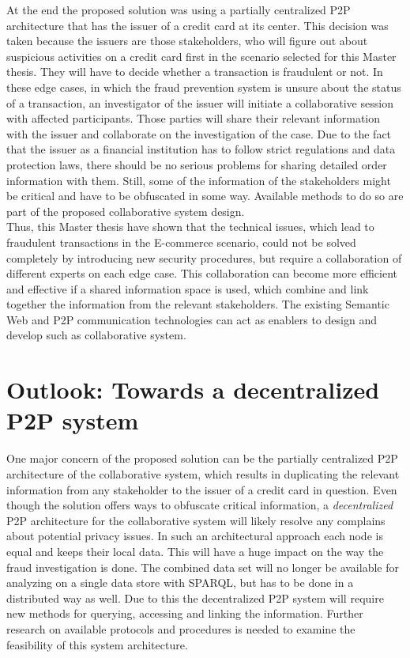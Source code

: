 At the end the proposed solution was using a partially centralized \gls{P2P} architecture that has the issuer of a credit card at its center. This decision was taken because the issuers are those stakeholders, who will figure out about suspicious activities on a credit card first in the scenario selected for this Master thesis. They will have to decide whether a transaction is fraudulent or not. In these edge cases, in which the fraud prevention system is unsure about the status of a transaction, an investigator of the issuer will initiate a collaborative session with affected participants. Those parties will share their relevant information with the issuer and collaborate on the investigation of the case. Due to the fact that the issuer as a financial institution has to follow strict regulations and data protection laws, there should be no serious problems for sharing detailed order information with them. Still, some of the information of the stakeholders might be critical and have to be obfuscated in some way. Available methods to do so are part of the proposed collaborative system design. \\

Thus, this Master thesis have shown that the technical issues, which lead to fraudulent transactions in the \gls{E-commerce} scenario, could not be solved completely by introducing new security procedures, but require a collaboration of different experts on each edge case. This collaboration can become more efficient and effective if a shared information space is used, which combine and link together the information from the relevant stakeholders. The existing Semantic Web and \gls{P2P} communication technologies can act as enablers to design and develop such as collaborative system.

\section{Outlook: Towards a decentralized \gls{P2P} system}
\label{sec:p2p_decentralized_system}

One major concern of the proposed solution can be the partially centralized \gls{P2P} architecture of the collaborative system, which results in duplicating the relevant information from any stakeholder to the issuer of a credit card in question. Even though the solution offers ways to obfuscate critical information, a \emph{decentralized} \gls{P2P} architecture for the collaborative system will likely resolve any complains about potential privacy issues. In such an architectural approach each node is equal and keeps their local data. This will have a huge impact on the way the fraud investigation is done. The combined data set will no longer be available for analyzing on a single data store with \gls{SPARQL}, but has to be done in a distributed way as well. Due to this the decentralized \gls{P2P} system will require new methods for querying, accessing and linking the information. Further research on available protocols and procedures is needed to examine the feasibility of this system architecture.


